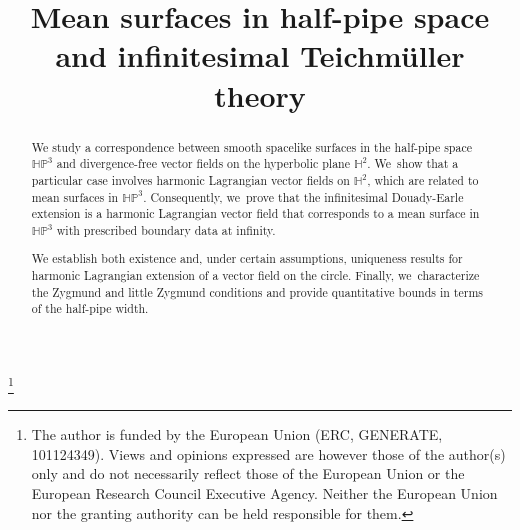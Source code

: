\documentclass[JEP,XML,SOM,Unicode,NoEqCountersInSection, NoFloatCountersInSection,published]{cedram}
\theoremstyle{plain}
\theoremstyle{definition}
\begin{document}
\frontmatter

\title{Mean surfaces in half-pipe space and infinitesimal Teichmüller theory}

\author[\initial{F.} \lastname{Diaf}]{ }
\address{Univ. Grenoble Alpes, CNRS, IF,\\
38000 Grenoble, France}

\thanks{The author is funded by the European Union (ERC, GENERATE, 101124349). Views and opinions expressed are however those of the author(s) only and do not necessarily reflect those of the European Union or the European Research Council Executive Agency. Neither the European Union nor the granting authority can be held responsible for them.}

\begin{abstract}
We study a correspondence between smooth spacelike surfaces in the half-pipe space $\mathbb{HP}^3$ and divergence-free vector fields on the hyperbolic plane \(\mathbb{H}^2\). We~show that a particular case involves harmonic Lagrangian vector fields on \(\mathbb{H}^2\), which are related to mean surfaces in \(\mathbb{HP}^3\). Consequently, we~prove that the infinitesimal Douady-Earle extension is a harmonic Lagrangian vector field that corresponds to a mean surface in \(\mathbb{HP}^3\) with prescribed boundary data at infinity.

We establish both existence and, under certain assumptions, uniqueness results for harmonic Lagrangian extension of a vector field on the circle. Finally, we~characterize the Zygmund and little Zygmund conditions and provide quantitative bounds in terms of the half-pipe width.
\end{abstract}




\end{document}
